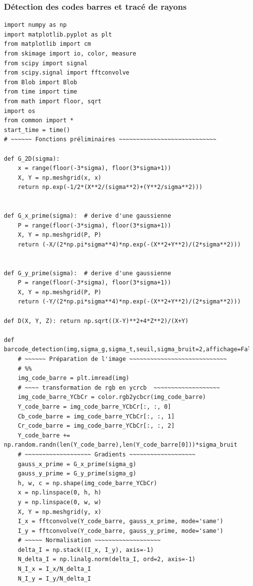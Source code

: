 \documentclass{rapport}
\begin{document}
\subsubsection{Détection des codes barres et tracé de rayons}
\begin{lstlisting}
import numpy as np
import matplotlib.pyplot as plt
from matplotlib import cm
from skimage import io, color, measure
from scipy import signal
from scipy.signal import fftconvolve
from Blob import Blob
from time import time
from math import floor, sqrt
import os
from common import * 
start_time = time()
# ~~~~~~ Fonctions préliminaires ~~~~~~~~~~~~~~~~~~~~~~~~~~~~

def G_2D(sigma):
    x = range(floor(-3*sigma), floor(3*sigma+1))
    X, Y = np.meshgrid(x, x)
    return np.exp(-1/2*(X**2/(sigma**2)+(Y**2/sigma**2)))


def G_x_prime(sigma):  # derive d'une gaussienne
    P = range(floor(-3*sigma), floor(3*sigma+1))
    X, Y = np.meshgrid(P, P)
    return (-X/(2*np.pi*sigma**4)*np.exp(-(X**2+Y**2)/(2*sigma**2)))


def G_y_prime(sigma):  # derive d'une gaussienne
    P = range(floor(-3*sigma), floor(3*sigma+1))
    X, Y = np.meshgrid(P, P)
    return (-Y/(2*np.pi*sigma**4)*np.exp(-(X**2+Y**2)/(2*sigma**2)))

def D(X, Y, Z): return np.sqrt((X-Y)**2+4*Z**2)/(X+Y)

def barcode_detection(img,sigma_g,sigma_t,seuil,sigma_bruit=2,affichage=False):
    # ~~~~~~ Préparation de l'image ~~~~~~~~~~~~~~~~~~~~~~~~~~~~
    # %%
    img_code_barre = plt.imread(img)
    # ~~~~ transformation de rgb en ycrcb  ~~~~~~~~~~~~~~~~~~~
    img_code_barre_YCbCr = color.rgb2ycbcr(img_code_barre)
    Y_code_barre = img_code_barre_YCbCr[:, :, 0]
    Cb_code_barre = img_code_barre_YCbCr[:, :, 1]
    Cr_code_barre = img_code_barre_YCbCr[:, :, 2]
    Y_code_barre += np.random.randn(len(Y_code_barre),len(Y_code_barre[0]))*sigma_bruit
    # ~~~~~~~~~~~~~~~~~~~ Gradients ~~~~~~~~~~~~~~~~~~~
    gauss_x_prime = G_x_prime(sigma_g)
    gauss_y_prime = G_y_prime(sigma_g)
    h, w, c = np.shape(img_code_barre_YCbCr)
    x = np.linspace(0, h, h)
    y = np.linspace(0, w, w)
    X, Y = np.meshgrid(y, x)
    I_x = fftconvolve(Y_code_barre, gauss_x_prime, mode='same')
    I_y = fftconvolve(Y_code_barre, gauss_y_prime, mode='same')
    # ~~~~~ Normalisation ~~~~~~~~~~~~~~~~~~~
    delta_I = np.stack((I_x, I_y), axis=-1)
    N_delta_I = np.linalg.norm(delta_I, ord=2, axis=-1)
    N_I_x = I_x/N_delta_I
    N_I_y = I_y/N_delta_I


\end{lstlisting}
\end{document}
